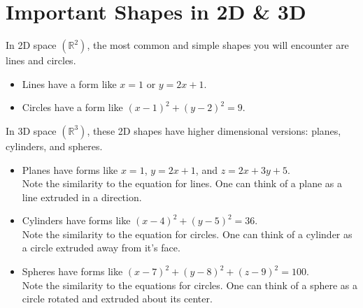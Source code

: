 \section{Important Shapes in 2D \& 3D}
\noindent
In 2D space $\left(\mathbb{R}^2\right)$, the most common and simple shapes you will encounter are lines and circles.
\begin{itemize}
	\item Lines have a form like $x=1$ or $y=2x+1$.
	\item Circles have a form like $\left(x-1\right)^2 + \left(y-2\right)^2 = 9$.
\end{itemize}

\noindent
In 3D space $\left(\mathbb{R}^3\right)$, these 2D shapes have higher dimensional versions: planes, cylinders, and spheres.
\begin{itemize}
	\item{Planes have forms like $x = 1$, $y = 2x+1$, and $z = 2x+3y+5$.\\
		\small{Note the similarity to the equation for lines. One can think of a plane as a line extruded in a direction.}}
	\item{Cylinders have forms like $\left(x-4\right)^2 + \left(y-5\right)^2 = 36$.\\
		\small{Note the similarity to the equation for circles. One can think of a cylinder as a circle extruded away from it's face.}}
	\item{Spheres have forms like $\left(x-7\right)^2 + \left(y-8\right)^2 + \left(z-9\right)^2 = 100$.\\
		\small{Note the similarity to the equations for circles. One can think of a sphere as a circle rotated and extruded about its center.}}
\end{itemize}